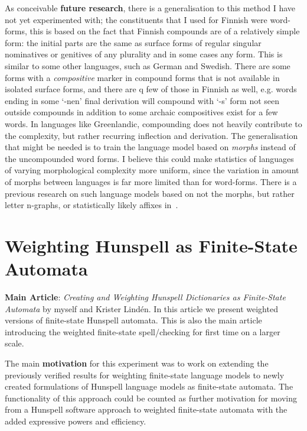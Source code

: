 \documentclass[officiallayout]{unihelcompling}
\begin{document}
As conceivable \textbf{future research}, there is a generalisation to this
method I have not yet experimented with; the constituents that I used for
Finnish were word-forms, this is based on the fact that Finnish compounds are
of a relatively simple form: the initial parts are the same as surface forms of
regular singular nominatives or genitives of any plurality and in some cases
any form. This is similar to some other languages, such as German and Swedish.
There are some forms with a \emph{compositive} marker in compound forms that is
not available in isolated surface forms, and there are q few of those in
Finnish as well, e.g.\/ words ending in some `-nen' final derivation will
compound with `-s' form not seen outside compounds in addition to some archaic
compositives exist for a few words.  In languages like Greenlandic, compounding
does not heavily contribute to the complexity, but rather recurring inflection
and derivation. The generalisation that might be needed is to train the
language model based on \emph{morphs} instead of the uncompounded word forms.
I believe this could make statistics of languages of varying morphological
complexity more uniform, since the variation in amount of morphs between
languages is far more limited than for word-forms. There is a previous research
on such language models based on not the morphs, but rather letter n-graphs, or
statistically likely affixes in~\citet{creutz2005morfessor}.


\section{Weighting Hunspell as Finite-State Automata}
\label{sec:hunspell-training}

\textbf{Main Article}: \emph{Creating and Weighting Hunspell Dictionaries as
Finite-State Automata} by myself and Krister Lindén. In this article we present
weighted versions of finite-state Hunspell automata. This is also the main
article introducing the weighted finite-state spell\-/checking for first time
on a larger scale.

The main \textbf{motivation} for this experiment was to work on extending the
previously verified results for weighting finite-state language models to newly
created formulations of Hunspell language models as finite-state automata. The
functionality of this approach could be counted as further motivation for
moving from a Hunspell software approach to weighted finite-state automata with
the added expressive powers and efficiency.
\end{document}
